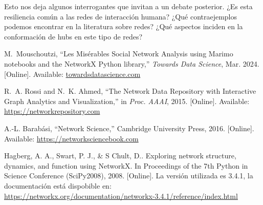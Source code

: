 \documentclass[conference]{IEEEtran}
\begin{document}
Esto nos deja algunos interrogantes que invitan a un debate posterior. ¿Es esta resiliencia común a las redes de interacción humana? ¿Qué contraejemplos podemos encontrar en la literatura sobre redes? ¿Qué aspectos inciden en la conformación de hubs en este tipo de redes? 

\begin{thebibliography}{00}
M.~Mouschoutzi, ``Les Misérables Social Network Analysis using Marimo notebooks and the NetworkX Python library,'' \emph{Towards Data Science}, Mar. 2024. [Online]. 
Available: \href{https://towardsdatascience.com/les-miserables-social-network-analysisusing-marimo-notebooks-and-the-networkx-python-library-%EF%B8%8F-%EF%B8%8F-3f433216412f/}{towardsdatascience.com}


R.~A. Rossi and N.~K. Ahmed, ``The Network Data Repository with Interactive Graph Analytics and Visualization,'' in \emph{Proc. AAAI}, 2015. [Online]. Available: \url{https://networkrepository.com}

A.-L. Barabási, ``Network Science,'' Cambridge University Press, 2016. [Online]. Available: \url{https://networksciencebook.com}

Hagberg, A. A., Swart, P. J., \& S Chult, D.. Exploring network structure, dynamics, and function using NetworkX. In Proceedings of the 7th Python in Science Conference (SciPy2008), 2008. [Online]. La versión utilizada es 3.4.1, la documentación está dispobible en: \url{https://networkx.org/documentation/networkx-3.4.1/reference/index.html}

\end{thebibliography}
\vspace{12pt}
\end{document}
